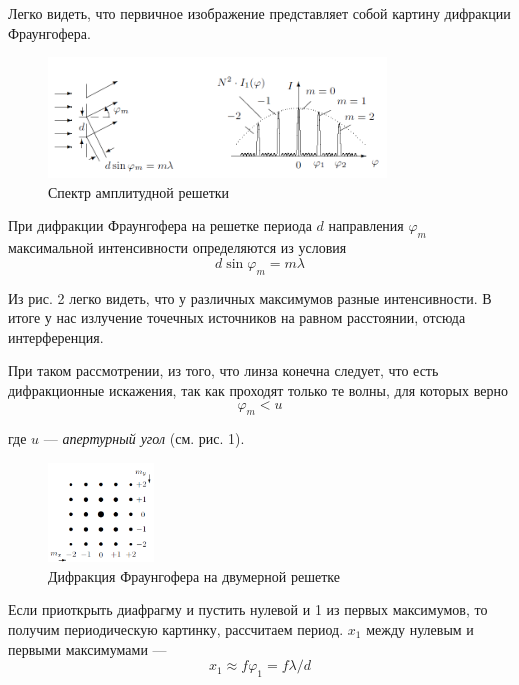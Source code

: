 \documentclass[a4paper, 12pt]{article}%
\begin{document}
Легко видеть, что первичное изображение представляет собой картину дифракции Фраунгофера. 

\begin{figure}[h]
\begin{center}
\includegraphics[width = 0.8\textwidth]{2.png}
\caption{Спектр амплитудной решетки}
\end{center}
\end{figure}
При дифракции Фраунгофера на решетке периода $d$ направления $\varphi_m$ максимальной интенсивности определяются из условия 
\begin{equation}
d \sin \varphi_m = m \lambda
\end{equation}

Из рис. 2 легко видеть, что у различных максимумов разные интенсивности.
В итоге у нас излучение точечных источников на равном расстоянии, отсюда интерференция. 

При таком рассмотрении, из того, что линза конечна следует, что есть дифракционные искажения, так как проходят только те волны, для которых верно 
\begin{equation}
\varphi_m < u
\end{equation}

где $u$ --- \textit{апертурный угол} (см. рис. 1).

\begin{figure}
  \begin{center}
    \includegraphics[width = 0.25\textwidth]{3.png}
  \end{center}
  \caption{Дифракция Фраунгофера на двумерной решетке}
\end{figure}

Если приоткрыть диафрагму и пустить нулевой и 1 из первых максимумов, то получим периодическую картинку, рассчитаем период. $x_1$ между нулевым и первыми максимумами ---
\begin{equation}
x_1 \approx f \varphi_1 = f \lambda/d
\end{equation} 
\end{document}
